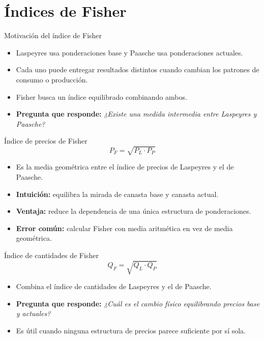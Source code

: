 \documentclass[aspectratio=169,11pt]{beamer}
\newcommand{\pregunta}[1]{\textbf{Pregunta que responde:} \emph{#1}}
\newcommand{\errorcomun}[1]{\textbf{Error común:} #1}
\newcommand{\intuicion}[1]{\textbf{Intuición:} #1}
\begin{document}
\section{Índices de Fisher}

\begin{frame}{Motivación del índice de Fisher}
\begin{itemize}
  \item Laspeyres usa ponderaciones base y Paasche usa ponderaciones actuales.
  \item Cada uno puede entregar resultados distintos cuando cambian los patrones de consumo o producción.
  \item Fisher busca un índice equilibrado combinando ambos.
  \item \pregunta{¿Existe una medida intermedia entre Laspeyres y Paasche?}
\end{itemize}
\end{frame}

\begin{frame}{Índice de precios de Fisher}
\[
P_F=\sqrt{P_L\cdot P_P}
\]
\begin{itemize}
  \item Es la media geométrica entre el índice de precios de Laspeyres y el de Paasche.
  \item \intuicion{equilibra la mirada de canasta base y canasta actual.}
  \item \textbf{Ventaja:} reduce la dependencia de una única estructura de ponderaciones.
  \item \errorcomun{calcular Fisher con media aritmética en vez de media geométrica.}
\end{itemize}
\end{frame}

\begin{frame}{Índice de cantidades de Fisher}
\[
Q_F=\sqrt{Q_L\cdot Q_P}
\]
\begin{itemize}
  \item Combina el índice de cantidades de Laspeyres y el de Paasche.
  \item \pregunta{¿Cuál es el cambio físico equilibrando precios base y actuales?}
  \item Es útil cuando ninguna estructura de precios parece suficiente por sí sola.
\end{itemize}
\end{frame}
\end{document}
